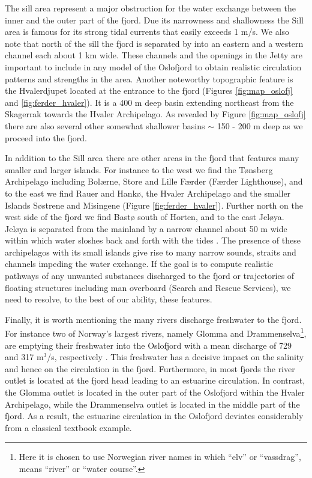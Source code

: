 The sill area represent a major obstruction for the water exchange between the inner and the outer part of the fjord. Due its narrowness and shallowness the {\DR} Sill area is famous for its strong tidal currents that easily exceeds 1 m/s. We also note that north of the sill the fjord is separated by {\HAA} into an eastern and a western channel each about 1 km wide. These channels and the openings in the Jetty are important to include in any model of the Oslofjord to obtain realistic circulation patterns and strengths in the area. Another noteworthy topographic feature is the Hvalerdjupet located at the entrance to the fjord (Figures \ref{fig:map_oslofj} and \ref{fig:ferder_hvaler}). It is a 400 m deep basin extending northeast from the Skagerrak towards the Hvaler Archipelago. As revealed by Figure \ref{fig:map_oslofj} there are also several other somewhat shallower basins $\sim$ 150 - 200 m deep as we proceed into the fjord. 
 

In addition to the {\DR} Sill area there are other areas in the fjord that features many smaller and larger islands. For instance to the west we find the T{\o}nsberg Archipelago including Bol{\ae}rne, Store and Lille F{\ae}rder (F{\ae}rder Lighthouse), and to the east we find Rauer and Hank{\o}, the Hvaler Archipelago and the smaller Islands S{\o}strene and Misingene (Figure \ref{fig:ferder_hvaler}). Further north on the west side of the fjord we find Bast{\o} south of Horten, and to the east Jel{\o}ya. Jel{\o}ya is separated from the mainland by a narrow channel about 50 m wide within which water sloshes back and forth with the tides \citep{hjelm:etal:2014}. The presence of these archipelagos with its small islands give rise to many narrow sounds, straits and channels impeding the water exchange. If the goal is to compute realistic pathways of any unwanted substances discharged to the fjord or trajectories of floating structures including man overboard (Search and Rescue Services), we need to resolve, to the best of our ability, these features. 

Finally, it is worth mentioning the many rivers discharge freshwater to the fjord. For instance two of Norway's largest rivers, namely Glomma and Drammenselva\footnote{Here it is chosen to use Norwegian river names in which ``elv'' or ``vassdrag'', means ``river'' or ``water course''.}, are emptying their freshwater into the Oslofjord with a mean discharge of 729 and 317 m$^3$/s, respectively \citep{milli:etal:2011}. This freshwater has a decisive impact on the salinity and hence on the circulation in the fjord. Furthermore, in most fjords the river outlet is located at the fjord head leading to an estuarine circulation. In contrast, the Glomma outlet is located in the outer part of the Oslofjord within the Hvaler Archipelago, while the Drammenselva outlet is located in the middle part of the fjord. As a result, the estuarine circulation in the Oslofjord deviates considerably from a classical textbook example.        



